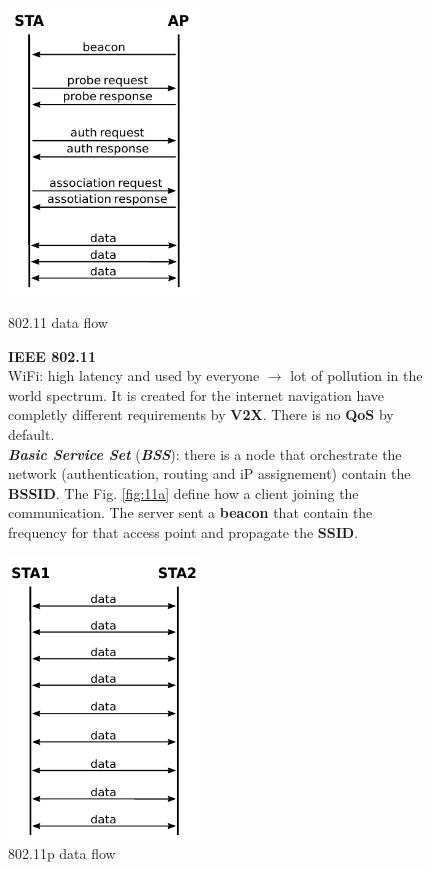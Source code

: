 \begin{figure}[h]
    \centering
    \begin{minipage}[t]{0.45\textwidth}
        \centering
        \includegraphics[width=0.45\textwidth]{img/11a}
        \caption{802.11 data flow}
        \label{fig:11a}
        
        \begin{flushleft}
            \textbf{IEEE 802.11} \\
            WiFi: high latency and used by everyone $\rightarrow$ lot of pollution in the world spectrum. It is created for the internet navigation have completly different requirements by \textbf{V2X}. There is no \textbf{QoS} by default. \\
            \textbf{\textit{Basic Service Set}} (\textbf{\textit{BSS}}): there is a node that orchestrate the network (authentication, routing and iP assignement) contain the \textbf{BSSID}. The Fig. \ref{fig:11a} define how a client joining the communication. The server sent a \textbf{beacon} that contain the frequency for that access point and propagate the \textbf{SSID}.
        \end{flushleft}
    \end{minipage}
    \begin{minipage}[t]{0.45\textwidth}
        \centering
        \includegraphics[width=0.45\textwidth]{img/11p}
        \caption{802.11p data flow}
        \label{fig:11p}


\end{minipage}
\end{figure}
